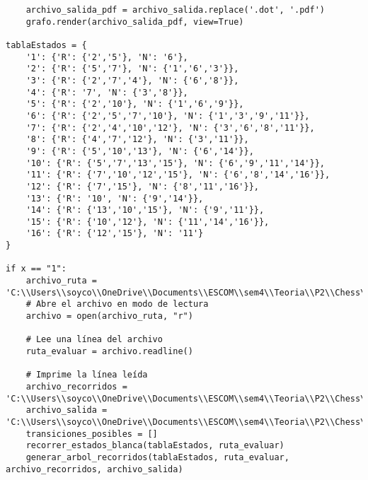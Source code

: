 \begin{lstlisting}
    archivo_salida_pdf = archivo_salida.replace('.dot', '.pdf')
    grafo.render(archivo_salida_pdf, view=True)

tablaEstados = {
    '1': {'R': {'2','5'}, 'N': '6'},
    '2': {'R': {'5','7'}, 'N': {'1','6','3'}},
    '3': {'R': {'2','7','4'}, 'N': {'6','8'}},
    '4': {'R': '7', 'N': {'3','8'}},
    '5': {'R': {'2','10'}, 'N': {'1','6','9'}},
    '6': {'R': {'2','5','7','10'}, 'N': {'1','3','9','11'}},
    '7': {'R': {'2','4','10','12'}, 'N': {'3','6','8','11'}},
    '8': {'R': {'4','7','12'}, 'N': {'3','11'}},
    '9': {'R': {'5','10','13'}, 'N': {'6','14'}},
    '10': {'R': {'5','7','13','15'}, 'N': {'6','9','11','14'}},
    '11': {'R': {'7','10','12','15'}, 'N': {'6','8','14','16'}},
    '12': {'R': {'7','15'}, 'N': {'8','11','16'}},
    '13': {'R': '10', 'N': {'9','14'}},
    '14': {'R': {'13','10','15'}, 'N': {'9','11'}},
    '15': {'R': {'10','12'}, 'N': {'11','14','16'}},
    '16': {'R': {'12','15'}, 'N': '11'}
}

if x == "1":
    archivo_ruta = 'C:\\Users\\soyco\\OneDrive\\Documents\\ESCOM\\sem4\\Teoria\\P2\\Chess\\output\\ruta_blanca.txt'
    # Abre el archivo en modo de lectura
    archivo = open(archivo_ruta, "r")

    # Lee una línea del archivo
    ruta_evaluar = archivo.readline()

    # Imprime la línea leída
    archivo_recorridos = 'C:\\Users\\soyco\\OneDrive\\Documents\\ESCOM\\sem4\\Teoria\\P2\\Chess\\output\\recorridos_blanca.txt'
    archivo_salida = 'C:\\Users\\soyco\\OneDrive\\Documents\\ESCOM\\sem4\\Teoria\\P2\\Chess\\output\\arbol_blanca.dot'
    transiciones_posibles = []
    recorrer_estados_blanca(tablaEstados, ruta_evaluar)
    generar_arbol_recorridos(tablaEstados, ruta_evaluar, archivo_recorridos, archivo_salida)
    

\end{lstlisting}
